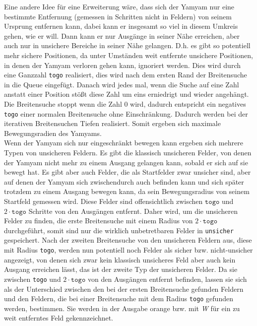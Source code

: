 \documentclass[12pt]{article}
\begin{document}
Eine andere Idee für eine Erweiterung wäre, dass sich der Yamyam nur eine bestimmte Entfernung (gemessen in Schritten nicht in Feldern) von seinem Ursprung entfernen kann, dabei kann er insgesamt so viel in diesem Umkreis gehen, wie er will. Dann kann er nur Ausgänge in seiner Nähe erreichen, aber auch nur in unsichere Bereiche in seiner Nähe gelangen. D.h. es gibt so potentiell mehr sichere Positionen, da unter Umständen weit entfernte unsichere Positionen, in denen der Yamyam verloren gehen kann, ignoriert werden. Dies wird durch eine Ganzzahl \texttt{togo} realisiert, dies wird nach dem ersten Rand der Breitensuche in die Queue eingefügt. Danach wird jedes mal, wenn die Suche auf eine Zahl anstatt einer Position stößt diese Zahl um eins erniedrigt und wieder angehängt. Die Breitensuche stoppt wenn die Zahl 0 wird, dadurch entspricht ein negatives \texttt{togo} einer normalen Breitensuche ohne Einschränkung. Dadurch werden bei der iterativen Breitensuchen Tiefen realisiert. Somit ergeben sich maximale Bewegungsradien des Yamyams. \\

Wenn der Yamyam sich nur eingeschränkt bewegen kann ergeben sich mehrere Typen von unsicheren Feldern. Es gibt die klassisch unsicheren Felder, von denen der Yamyam nicht mehr zu einem Ausgang gelangen kann, sobald er sich auf sie bewegt hat. Es gibt aber auch Felder, die als Startfelder zwar unsicher sind, aber auf denen der Yamyam sich zwischendurch auch befinden kann und sich später trotzdem zu einem Ausgang bewegen kann, da sein Bewegungsradius von seinem Startfeld gemessen wird. Diese Felder sind offensichtlich zwischen $\texttt{togo}$ und $2\cdot\texttt{togo}$ Schritte von den Ausgängen entfernt. Daher wird, um die unsicheren Felder zu finden, die erste Breitensuche mit einem Radius von $2\cdot\texttt{togo}$ durchgeführt, somit sind nur die wirklich unbetretbaren Felder in \texttt{unsicher} gespeichert. Nach der zweiten Breitensuche von den unsicheren Feldern aus, diese mit Radius \texttt{togo}, werden nun potentiell noch Felder als sicher bzw. nicht-unsicher angezeigt, von denen sich zwar kein klassisch unsicheres Feld aber auch kein Ausgang erreichen lässt, das ist der zweite Typ der unsicheren Felder. Da sie zwischen \texttt{togo} und $2\cdot\texttt{togo}$ von den Ausgängen entfernt befinden, lassen sie sich als der Unterschied zwischen den bei der ersten Breitensuche gefunden Feldern und den Feldern, die bei einer Breitensuche mit dem Radius \texttt{togo} gefunden werden, bestimmen. Sie werden in der Ausgabe orange bzw. mit \textit{W} für ein zu weit entferntes Feld gekennzeichnet. \\
\end{document}
